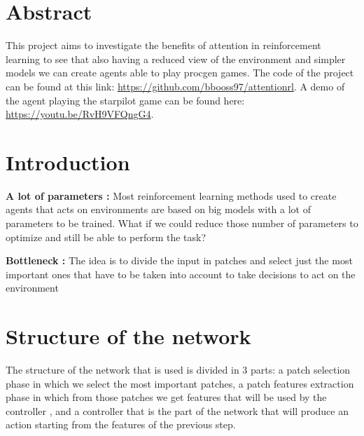 \documentclass{article}
\begin{document}

\printAffiliationsAndNotice{}

\section{Abstract}
%
This project aims to investigate the benefits of attention in reinforcement learning to see that also having a reduced view of the environment and simpler models we can create agents able to play procgen games.
The code of the project can be found at this link:
\url{https://github.com/bbooss97/attentionrl}.
A demo of the agent playing the starpilot game can be found here:
\url{https://youtu.be/RvH9VFQngG4}.
%


\section{Introduction}

\textbf{A lot of parameters :}
Most reinforcement learning methods used to create agents that acts on environments are based on big models with a lot of parameters to be trained.
What if we could reduce those number of parameters to optimize and still be able to perform the task?

\textbf{Bottleneck :} 
The idea is to divide the input in patches and select just the most important ones that have to be taken into account to take decisions to act on the environment

\section{Structure of the network}
The structure of the network that is used is divided in 3 parts: 
a patch selection phase in which we select the most important patches, a patch features extraction phase in which from those patches we get features that will be used by the controller , and a controller that is the part of the network that will produce an action starting from the features of the previous step.
\end{document}
